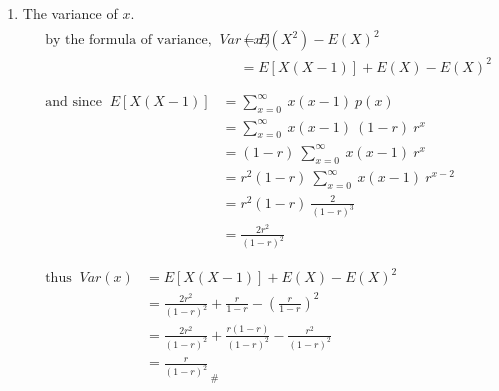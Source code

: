 \begin{enumerate}
        \item The variance of $x$.
            \begin{align*}
                &\begin{aligned}
                    \text{by the formula of variance, } \ Var(x) &= E(X^2) - E(X)^2\\
                    &= E[X(X-1)] + E(X) - E(X)^2\\
                \end{aligned}\\
                &\begin{aligned}
                    \text{and since }\  E[X(X-1)] &= \sum_{x=0}^{\infty}\ x(x-1)\ p(x)\\
                    &= \sum_{x=0}^{\infty}\ x(x-1)\ (1-r) \ r^x\\
                    &= (1-r) \ \sum_{x=0}^{\infty}\ x(x-1)\ r^x\\
                    &= r^2(1-r) \ \sum_{x=0}^{\infty}\ x(x-1)\ r^{x-2}\\
                    &= r^2(1-r) \ \frac{2}{(1-r)^3}\\
                    &= \frac{2r^2}{(1-r)^2}\\
                \end{aligned}\\            
                &\begin{aligned}
                    \text{thus } \  Var(x) &= E[X(X-1)] + E(X) - E(X)^2\\
                    &= \frac{2r^2}{(1-r)^2} + \frac{r}{1-r} - \left(\frac{r}{1-r}\right)^2\\
                    &= \frac{2r^2}{(1-r)^2} + \frac{r(1-r)}{(1-r)^2} - \frac{r^2}{(1-r)^2}\\
                    &= \frac{r}{(1-r)^2}_{ \ \#}\\
                \end{aligned}\\
            \end{align*}
        
    \end{enumerate}